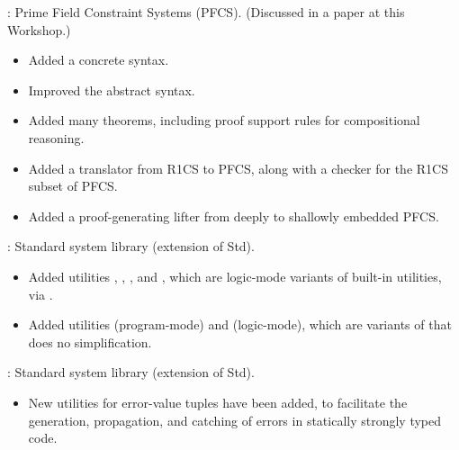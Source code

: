 
\begin{frame}

\implibtitle

:
Prime Field Constraint Systems (PFCS).
(Discussed in a paper at this Workshop.)
\begin{itemize}
\item Added a concrete syntax.
\item Improved the abstract syntax.
\item Added many theorems,
      including proof support rules for compositional reasoning.
\item Added a translator from R1CS to PFCS,
      along with a checker for the R1CS subset of PFCS.
\item Added a proof-generating lifter from deeply to shallowly embedded PFCS.
\end{itemize}

\end{frame}


\begin{frame}

\implibtitle

:
Standard system library (extension of Std).
\begin{itemize}
\item Added utilities
      ,
      ,
      , and
      ,
      which are logic-mode variants of built-in utilities,
      via .
\item Added utilities
       (program-mode) and
       (logic-mode),
      which are variants of  that does no simplification.
\end{itemize}

\end{frame}


\begin{frame}

\implibtitle

:
Standard system library (extension of Std).
\begin{itemize}
\item New utilities for error-value tuples have been added,
      to facilitate the generation, propagation, and catching of errors
      in statically strongly typed code.
\end{itemize}

\end{frame}

